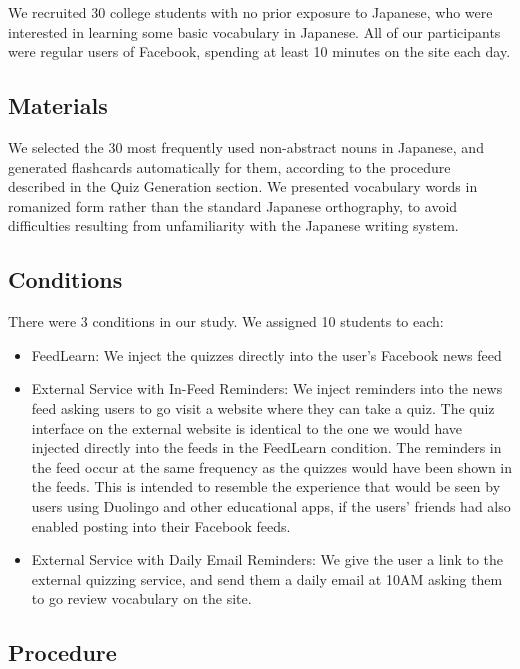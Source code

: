 \documentclass{chi-ext}
\begin{document}
We recruited 30 college students with no prior exposure to Japanese, who were interested in learning some basic vocabulary in Japanese. All of our participants were regular users of Facebook, spending at least 10 minutes on the site each day.

\subsection{Materials}

We selected the 30 most frequently used non-abstract nouns in Japanese, and generated flashcards automatically for them, according to the procedure described in the Quiz Generation section. We presented vocabulary words in romanized form rather than the standard Japanese orthography, to avoid difficulties resulting from unfamiliarity with the Japanese writing system.

\subsection{Conditions}

There were 3 conditions in our study. We assigned 10 students to each:

\begin{itemize}
\item FeedLearn: We inject the quizzes directly into the user's Facebook news feed
\item External Service with In-Feed Reminders: We inject reminders into the news feed asking users to go visit a website where they can take a quiz. The quiz interface on the external website is identical to the one we would have injected directly into the feeds in the FeedLearn condition. The reminders in the feed occur at the same frequency as the quizzes would have been shown in the feeds. This is intended to resemble the experience that would be seen by users using Duolingo and other educational apps, if the users' friends had also enabled posting into their Facebook feeds.
\item External Service with Daily Email Reminders: We give the user a link to the external quizzing service, and send them a daily email at 10AM asking them to go review vocabulary on the site.
\end{itemize}

\subsection{Procedure}
\end{document}
